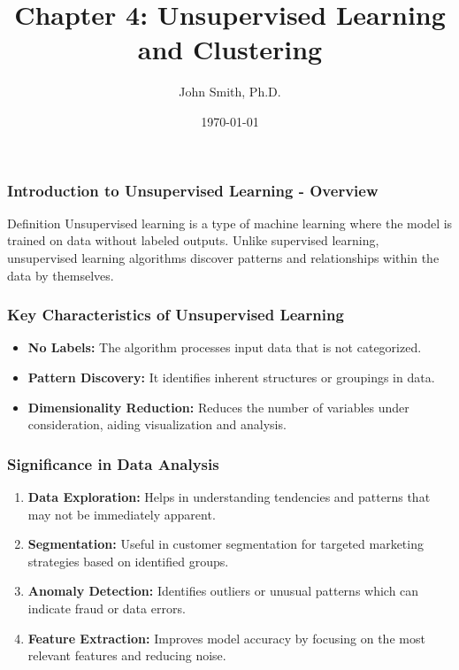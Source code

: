 \documentclass[aspectratio=169]{beamer}
\title[Chapter 4: Unsupervised Learning and Clustering]{Chapter 4: Unsupervised Learning and Clustering}
\author[J. Smith]{John Smith, Ph.D.}
\institute[University Name]{
  Department of Computer Science\\
  University Name\\
  \vspace{0.3cm}
  Email: email@university.edu\\
  Website: www.university.edu
}
\date{\today}
\begin{document}
\frame{\titlepage}

\begin{frame}[fragile]
    \titlepage
\end{frame}

\begin{frame}[fragile]
    \frametitle{Introduction to Unsupervised Learning - Overview}
    \begin{block}{Definition}
        Unsupervised learning is a type of machine learning where the model is trained on data without labeled outputs. Unlike supervised learning, unsupervised learning algorithms discover patterns and relationships within the data by themselves.
    \end{block}
\end{frame}

\begin{frame}[fragile]
    \frametitle{Key Characteristics of Unsupervised Learning}
    \begin{itemize}
        \item \textbf{No Labels:} The algorithm processes input data that is not categorized.
        \item \textbf{Pattern Discovery:} It identifies inherent structures or groupings in data.
        \item \textbf{Dimensionality Reduction:} Reduces the number of variables under consideration, aiding visualization and analysis.
    \end{itemize}
\end{frame}

\begin{frame}[fragile]
    \frametitle{Significance in Data Analysis}
    \begin{enumerate}
        \item \textbf{Data Exploration:} Helps in understanding tendencies and patterns that may not be immediately apparent.
        \item \textbf{Segmentation:} Useful in customer segmentation for targeted marketing strategies based on identified groups.
        \item \textbf{Anomaly Detection:} Identifies outliers or unusual patterns which can indicate fraud or data errors.
        \item \textbf{Feature Extraction:} Improves model accuracy by focusing on the most relevant features and reducing noise.
    \end{enumerate}
\end{frame}
\end{document}
